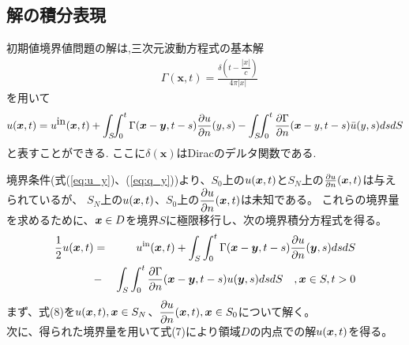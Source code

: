 \documentclass[dvipdfmx]{ampbt}
\def\vector#1{\mbox{\boldmath $#1$}}
\begin{document}
\subsection{解の積分表現}
初期値境界値問題の解は,三次元波動方程式の基本解
\begin{align}
&\Gamma(\bm{x},t) = \displaystyle \frac{\delta(t-\dfrac{|x|}{c})}{4\pi|x|}
\end{align}
を用いて
\begin{equation}
  \label{eq:境界積分方程式}
u(\bm{x},t) = u^{\mbox{in}}(\vector{x},t) + \int_S\!\!\int_0^t \Gamma(\bm{x}-\vector{y},t-s) \frac{\partial u}{\partial n}(y,s) - \int_S\!\!\int_0^t \frac{\partial \Gamma}{\partial n}(\bm{x}-y,t-s) \bar{u}(y,s) ds dS
\end{equation}
と表すことができる.
ここに$\delta(\bm{x})$はDiracのデルタ関数である.

境界条件(式(\ref{eq:u_y})、(\ref{eq:q_y}))より、$S_0$上の$u(\vector{x},t)$と$S_N$上の$\frac{\partial u}{\partial n}(\vector{x},t)$は与えられているが、
$S_N$上の$u(\vector{x},t)$、$S_0$上の$\dfrac{\partial u}{\partial n}(\vector{x},t)$は未知である。
これらの境界量を求めるために、$\vector{x} \in D$を境界$S$に極限移行し、次の境界積分方程式を得る。
\begin{eqnarray}
\frac{1}{2} u(\vector{x},t) &=& u^{\rm{in}}(\vector{x},t) + \int_S \int_0^t \Gamma (\vector{x}-\vector{y},t-s) \frac{\partial u}{\partial n}(\vector{y},s) ds dS \nonumber \\
                                               &-& \int_S \int_0^t \frac{\partial \Gamma}{\partial n} (\vector{x}-\vector{y},t-s) u(\vector{y},s) ds dS \quad, \vector{x} \in S , t > 0
\end{eqnarray}
まず、式(8)を$u(\vector{x},t) , \vector{x} \in S_N$、$\dfrac{\partial u}{\partial n}(\vector{x},t) , \vector{x} \in S_0$について解く。\\
次に、得られた境界量を用いて式(7)により領域$D$の内点での解$u(\vector{x},t)$を得る。
\end{document}
